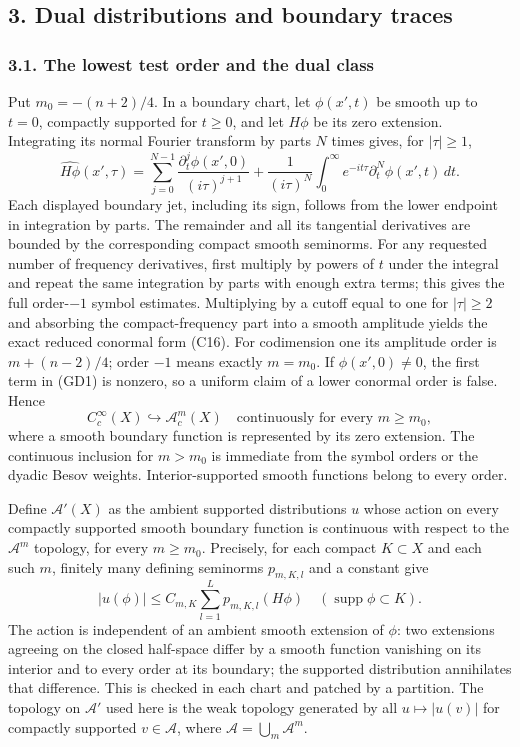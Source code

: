 \documentclass[
  11pt,
]{article}
\begin{document}
\subsection{3. Dual distributions and boundary
traces}\label{dual-distributions-and-boundary-traces}

\subsubsection{3.1. The lowest test order and the dual
class}\label{the-lowest-test-order-and-the-dual-class}

Put \(m_0=-(n+2)/4\). In a boundary chart, let \(\phi(x',t)\) be smooth
up to \(t=0\), compactly supported for \(t\ge0\), and let \(H\phi\) be
its zero extension. Integrating its normal Fourier transform by parts
\(N\) times gives, for \(|\tau|\ge1\), \[
 \widehat{H\phi}(x',\tau)
 =\sum_{j=0}^{N-1}\frac{\partial_t^j\phi(x',0)}{(i\tau)^{j+1}}
  +\frac{1}{(i\tau)^N}
       \int_0^\infty e^{-it\tau}\partial_t^N\phi(x',t)\,dt .
 \tag{GD1}
\] Each displayed boundary jet, including its sign, follows from the
lower endpoint in integration by parts. The remainder and all its
tangential derivatives are bounded by the corresponding compact smooth
seminorms. For any requested number of frequency derivatives, first
multiply by powers of \(t\) under the integral and repeat the same
integration by parts with enough extra terms; this gives the full
order-\(-1\) symbol estimates. Multiplying by a cutoff equal to one for
\(|\tau|\ge2\) and absorbing the compact-frequency part into a smooth
amplitude yields the exact reduced conormal form (C16). For codimension
one its amplitude order is \(m+(n-2)/4\); order \(-1\) means exactly
\(m=m_0\). If \(\phi(x',0)\ne0\), the first term in (GD1) is nonzero, so
a uniform claim of a lower conormal order is false. Hence \[
 C_c^\infty(X)\hookrightarrow\mathcal A^m_c(X)
 \quad\text{continuously for every }m\ge m_0,
 \tag{GD2}
\] where a smooth boundary function is represented by its zero
extension. The continuous inclusion for \(m>m_0\) is immediate from the
symbol orders or the dyadic Besov weights. Interior-supported smooth
functions belong to every order.

Define \(\mathcal A'(X)\) as the ambient supported distributions \(u\)
whose action on every compactly supported smooth boundary function is
continuous with respect to the \(\mathcal A^m\) topology, for every
\(m\ge m_0\). Precisely, for each compact \(K\subset X\) and each such
\(m\), finitely many defining seminorms \(p_{m,K,l}\) and a constant
give \[
 |u(\phi)|\le C_{m,K}\sum_{l=1}^{L}p_{m,K,l}(H\phi)
 \quad(\operatorname{supp}\phi\subset K).
 \tag{GD3}
\] The action is independent of an ambient smooth extension of \(\phi\):
two extensions agreeing on the closed half-space differ by a smooth
function vanishing on its interior and to every order at its boundary;
the supported distribution annihilates that difference. This is checked
in each chart and patched by a partition. The topology on
\(\mathcal A'\) used here is the weak topology generated by all
\(u\mapsto|u(v)|\) for compactly supported \(v\in\mathcal A\), where
\(\mathcal A=\bigcup_m\mathcal A^m\).
\end{document}

